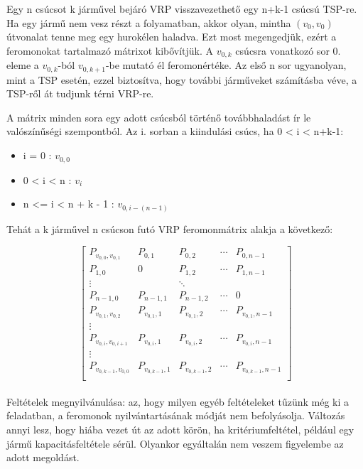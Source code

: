 Egy n csúcsot k járművel bejáró VRP visszavezethető egy n+k-1 csúcsú TSP-re. Ha egy jármű nem vesz részt a folyamatban, akkor olyan, mintha \( (v_0,v_0) \) útvonalat tenne meg egy hurokélen haladva. Ezt most megengedjük, ezért a feromonokat tartalmazó mátrixot kibővítjük. A \(v_{0,k} \) csúcsra vonatkozó sor 0. eleme a \( v_{0,k}\)-ból \(v_{0,k+1}\)-be mutató él feromonértéke. Az első n sor ugyanolyan, mint a TSP esetén, ezzel biztosítva, hogy további járműveket számításba véve, a TSP-ről át tudjunk térni VRP-re.

A mátrix minden sora egy adott csúcsból történő továbbhaladást ír le valószínűségi szempontból. Az i. sorban a kiindulási csúcs, ha 0 < i < n+k-1:
\begin{itemize}
	\item i = 0 :  \(v_{0,0}\)
	\item 0 < i < n : \(v_i\)
	\item n <= i < n + k - 1 :  \(v_{0,i-(n-1)}\)
\end{itemize}

Tehát a k járművel n csúcson futó VRP feromonmátrix alakja a következő:

\begin{equation}
	\begin{bmatrix}
		P_{v_{0,0},v_{0,1}} & P_{0,1} & P_{0,2} & \cdots & P_{0,n-1}\\ 
		P_{1,0} & 0 & P_{1,2} & \cdots & P_{1,n-1} \\
		\vdots & & \ddots \\
		P_{n-1,0} & P_{n-1,1} & P_{n-1,2} & \cdots & 0 \\
		P_{v_{0,1},v_{0,2}} & P_{v_{0,1},1} & P_{v_{0,1},2} & \cdots & P_{v_{0,1},n-1} \\
		\vdots & & \\
		P_{v_{0,i},v_{0,i+1}} & P_{v_{0,i},1} & P_{v_{0,i},2} & \cdots & P_{v_{0,i},n-1} \\
		\vdots & & \\
		P_{v_{0,k-1},v_{0,0}} & P_{v_{0,k-1},1} & P_{v_{0,k-1},2} & \cdots & P_{v_{0,k-1},n-1} \\
	\end{bmatrix}
\end{equation}



\paragraph{}
Feltételek megnyilvánulása: az, hogy milyen egyéb feltételeket tűzünk még ki a feladatban, a feromonok nyilvántartásának módját nem befolyásolja. Változás annyi lesz, hogy hiába vezet út az adott körön, ha kritériumfeltétel, például egy jármű kapacitásfeltétele sérül. Olyankor egyáltalán nem veszem figyelembe az adott megoldást.



